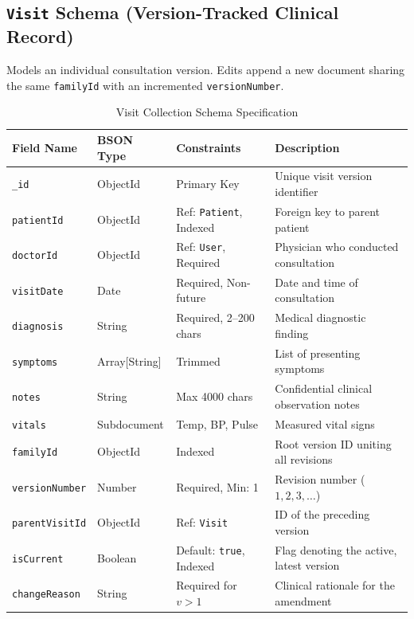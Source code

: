 \documentclass[12pt,a4paper,oneside]{report}
\begin{document}
\subsection{\texttt{Visit} Schema (Version-Tracked Clinical Record)}
Models an individual consultation version. Edits append a new document sharing the same \texttt{familyId} with an incremented \texttt{versionNumber}.
\begin{table}[h!]
\centering
\caption{Visit Collection Schema Specification}
\small
\begin{tabularx}{\textwidth}{l l l X}
\toprule
\textbf{Field Name} & \textbf{BSON Type} & \textbf{Constraints} & \textbf{Description} \\
\midrule
\texttt{\_id} & ObjectId & Primary Key & Unique visit version identifier \\
\texttt{patientId} & ObjectId & Ref: \texttt{Patient}, Indexed & Foreign key to parent patient \\
\texttt{doctorId} & ObjectId & Ref: \texttt{User}, Required & Physician who conducted consultation \\
\texttt{visitDate} & Date & Required, Non-future & Date and time of consultation \\
\texttt{diagnosis} & String & Required, 2--200 chars & Medical diagnostic finding \\
\texttt{symptoms} & Array[String] & Trimmed & List of presenting symptoms \\
\texttt{notes} & String & Max 4000 chars & Confidential clinical observation notes \\
\texttt{vitals} & Subdocument & Temp, BP, Pulse & Measured vital signs \\
\texttt{familyId} & ObjectId & Indexed & Root version ID uniting all revisions \\
\texttt{versionNumber} & Number & Required, Min: 1 & Revision number ($1, 2, 3, \dots$) \\
\texttt{parentVisitId} & ObjectId & Ref: \texttt{Visit} & ID of the preceding version \\
\texttt{isCurrent} & Boolean & Default: \texttt{true}, Indexed & Flag denoting the active, latest version \\
\texttt{changeReason} & String & Required for $v > 1$ & Clinical rationale for the amendment \\
\bottomrule
\end{tabularx}
\end{table}
\end{document}
